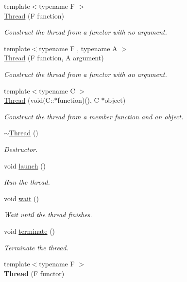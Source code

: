 \begin{DoxyCompactItemize}
\item 
{\footnotesize template$<$typename F $>$ }\\\hyperlink{classsf_1_1_thread_a4cc65399bbb111cf8132537783b8e96c}{Thread} (F function)
\begin{DoxyCompactList}\small\item\em Construct the thread from a functor with no argument. \end{DoxyCompactList}\item 
{\footnotesize template$<$typename F , typename A $>$ }\\\hyperlink{classsf_1_1_thread_a719b2cc067d92d52c35064a49d850a53}{Thread} (F function, A argument)
\begin{DoxyCompactList}\small\item\em Construct the thread from a functor with an argument. \end{DoxyCompactList}\item 
{\footnotesize template$<$typename C $>$ }\\\hyperlink{classsf_1_1_thread_aa9f473c8cbb078900c62b1fd14a83a34}{Thread} (void(C\+::$\ast$function)(), C $\ast$object)
\begin{DoxyCompactList}\small\item\em Construct the thread from a member function and an object. \end{DoxyCompactList}\item 
\hyperlink{classsf_1_1_thread_af77942fc1730af7c31bc4c3a913a9c1d}{$\sim$\+Thread} ()
\begin{DoxyCompactList}\small\item\em Destructor. \end{DoxyCompactList}\item 
void \hyperlink{classsf_1_1_thread_a74f75a9e86e1eb47479496314048b5f6}{launch} ()
\begin{DoxyCompactList}\small\item\em Run the thread. \end{DoxyCompactList}\item 
void \hyperlink{classsf_1_1_thread_a724b1f94c2d54f84280f2f78bde95fa0}{wait} ()
\begin{DoxyCompactList}\small\item\em Wait until the thread finishes. \end{DoxyCompactList}\item 
void \hyperlink{classsf_1_1_thread_ad6b205d4f1ce38b8d44bba0f5501477c}{terminate} ()
\begin{DoxyCompactList}\small\item\em Terminate the thread. \end{DoxyCompactList}\item 
\hypertarget{classsf_1_1_thread_a00b88f036de66eb63765f4c12ceb6870}{{\footnotesize template$<$typename F $>$ }\\{\bfseries Thread} (F functor)}\label{classsf_1_1_thread_a00b88f036de66eb63765f4c12ceb6870}


\end{DoxyCompactItemize}
